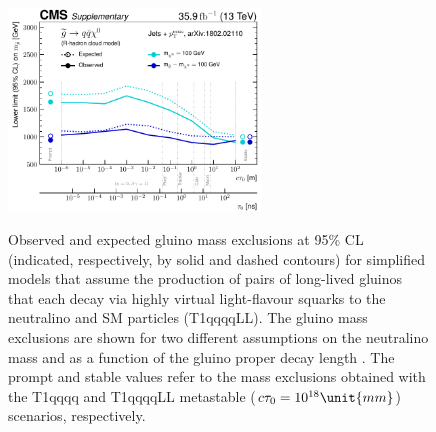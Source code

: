 \clearpage
\begin{figure}[!t]
  \centering
  \includegraphics[width=0.6\textwidth]{Supplementary/CMS-SUS-16-038_Figure-aux_026}\\
  \caption{Observed and expected gluino mass exclusions at 95\% CL
    (indicated, respectively, by solid and dashed contours) for
    simplified models that assume the production of pairs of
    long-lived gluinos that each decay via highly virtual
    light-flavour squarks to the neutralino and SM particles
    (T1qqqqLL). The gluino mass exclusions are shown for two different
    assumptions on the neutralino mass and as a function of
    the gluino proper decay length \ctau. The prompt and stable values
    refer to the mass exclusions obtained with the T1qqqq and T1qqqqLL
    metastable ($\ctau = 10^{18}\unit{mm}$) scenarios, respectively.}
  \label{fig:limits_vs_ctau} 
\end{figure}

